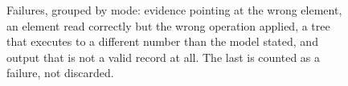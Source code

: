 \begin{figure}[t]
\centering
\caption{Failures, grouped by mode: evidence pointing at the wrong element, an element read correctly but the wrong operation applied, a tree that executes to a different number than the model stated, and output that is not a valid record at all. The last is counted as a failure, not discarded.}
\label{fig:qualitative_failure}
\end{figure}

